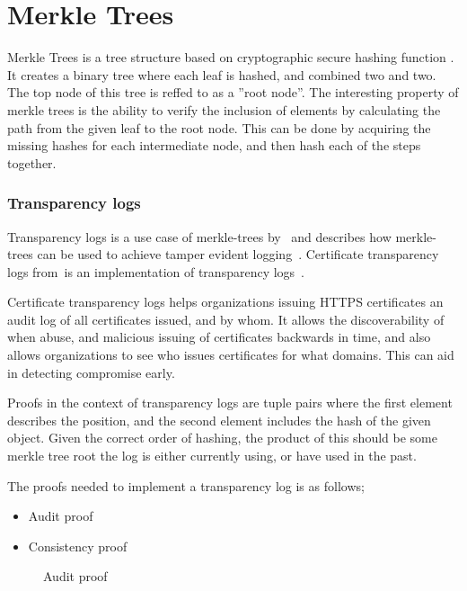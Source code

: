 \documentclass[../Main/thesis.tex]{subfiles}
\begin{document}
\section{Merkle Trees}%
\label{sec:merkle_trees}

Merkle Trees is a tree structure based on cryptographic secure hashing function
\cite{ralph-c.-merkle-1998}. It creates a binary tree where each leaf is hashed,
and combined two and two. The top node of this tree is reffed to as a ''root
node''. The interesting property of merkle trees is the ability to verify the
inclusion of elements by calculating the path from the given leaf to the root
node. This can be done by acquiring the missing hashes for each intermediate
node, and then hash each of the steps together.

\subsubsection{Transparency logs}%
\label{sub:certificate_transparency_log}
Transparency logs is a use case of merkle-trees by~\citeauthor{182788} and
describes how merkle-trees can be used to achieve tamper evident
logging~\cite{182788}. Certificate transparency logs
from~\citeauthor{b.-laurie-a.-langley-e.kaster-google-2013}is an implementation
of transparency logs~\cite{b.-laurie-a.-langley-e.kaster-google-2013}.

Certificate transparency logs helps organizations issuing HTTPS certificates an
audit log of all certificates issued, and by whom. It allows the discoverability
of when abuse, and malicious issuing of certificates backwards in time, and also
allows organizations to see who issues certificates for what domains. This can
aid in detecting compromise early.

Proofs in the context of transparency logs are tuple pairs where the first
element describes the position, and the second element includes the hash of
the given object. Given the correct order of hashing, the product of this
should be some merkle tree root the log is either currently using, or have
used in the past.

The proofs needed to implement a transparency log is as follows;
\begin{itemize}
\item Audit proof
\item Consistency proof
\end{itemize}

\begin{figure}[H]
\centering
{}%
\qquad
{}%
\caption{Audit proof}
\label{fig:audit}
\end{figure}
\end{document}
